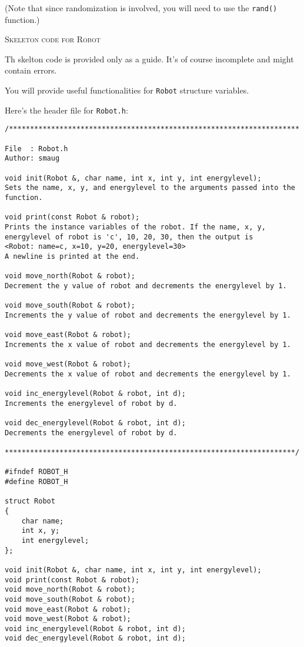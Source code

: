 (Note that since randomization is involved, you will 
need to use the \verb!rand()!
function.)

\newpage
\textsc{Skeleton code for Robot}

Th skelton code is provided only as a guide.
It's of course incomplete and might contain errors.

You will provide useful functionalities for
\verb!Robot! structure variables.

Here's the header file for \verb!Robot.h!:
{\small
\begin{Verbatim}[frame=single]
/*********************************************************************

File  : Robot.h
Author: smaug

void init(Robot &, char name, int x, int y, int energylevel);
Sets the name, x, y, and energylevel to the arguments passed into the 
function.

void print(const Robot & robot);
Prints the instance variables of the robot. If the name, x, y, 
energylevel of robot is 'c', 10, 20, 30, then the output is
<Robot: name=c, x=10, y=20, energylevel=30>
A newline is printed at the end.

void move_north(Robot & robot);
Decrement the y value of robot and decrements the energylevel by 1.

void move_south(Robot & robot);
Increments the y value of robot and decrements the energylevel by 1.

void move_east(Robot & robot);
Increments the x value of robot and decrements the energylevel by 1.

void move_west(Robot & robot);
Decrements the x value of robot and decrements the energylevel by 1.

void inc_energylevel(Robot & robot, int d);
Increments the energylevel of robot by d.

void dec_energylevel(Robot & robot, int d);
Decrements the energylevel of robot by d.

*********************************************************************/

#ifndef ROBOT_H
#define ROBOT_H

struct Robot
{
    char name;
    int x, y;
    int energylevel;
};

void init(Robot &, char name, int x, int y, int energylevel);
void print(const Robot & robot);
void move_north(Robot & robot);
void move_south(Robot & robot);
void move_east(Robot & robot);
void move_west(Robot & robot);
void inc_energylevel(Robot & robot, int d);
void dec_energylevel(Robot & robot, int d);


\end{Verbatim}}
